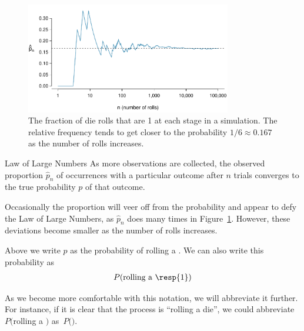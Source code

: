 \begin{figure}[ht]
\centering
\includegraphics[width=0.8\textwidth]{ch_probability/figures/dieProp/dieProp}
\caption{The fraction of die rolls that are 1 at each stage in a simulation. The relative frequency tends to get closer to the probability $1/6 \approx 0.167$ as the number of rolls increases.}
\label{dieProp}
\end{figure}

\begin{onebox}{Law of Large Numbers}
As more observations are collected, the observed proportion $\hat{p}_n$ of occurrences with a particular outcome after $n$ trials converges to the true probability $p$ of that outcome.\end{onebox}

Occasionally the proportion will veer off from the probability and appear to defy the Law of Large Numbers, as $\hat{p}_n$ does many times in Figure~\ref{dieProp}. However, these deviations become smaller as the number of rolls increases.

Above we write $p$ as the probability of rolling a . We can also write this probability as
\begin{eqnarray*}
P(\text{rolling a \resp{1}})
\end{eqnarray*}

As we become more comfortable with this notation, we will abbreviate it further. For instance, if it is clear that the process is ``rolling a die'', we could abbreviate $P($rolling a $)$ as~$P($$)$.

